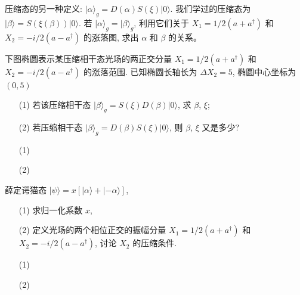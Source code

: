 \documentclass{assignment}
\begin{document}
\begin{prob}
    压缩态的另一种定义: $\lvert\alpha\rangle_g=D(\alpha)S(\xi)\lvert 0\rangle$. 我们学过的压缩态为 $\lvert\beta\rangle=S(\xi(\beta))\lvert 0\rangle$. 若 $\lvert\alpha\rangle_g=\lvert\beta\rangle_g$, 利用它们关于 $X_1=1/2(a+a^{\dagger})$ 和 $X_2=-i/2(a-a^{\dagger})$ 的涨落图, 求出 $\alpha$ 和 $\beta$ 的关系。
\end{prob}
\begin{sol}
    
\end{sol}

\begin{prob}
    下图椭圆表示某压缩相干态光场的两正交分量 $X_1=1/2(a+a^{\dagger})$ 和 $X_2=-i/2(a-a^{\dagger})$ 的涨落范围. 已知椭圆长轴长为 $\Delta X_2=5$, 椭圆中心坐标为 $(0,5)$
    \begin{itemize}
        \item[(1)] 若该压缩相干态 $\lvert\beta\rangle_g=S(\xi)D(\beta)\lvert 0\rangle$, 求 $\beta$, $\xi$;
        \item[(2)] 若压缩相干态 $\lvert\beta\rangle_g=D(\beta)S(\xi)\lvert 0\rangle$, 则 $\beta$, $\xi$ 又是多少?
    \end{itemize}
\end{prob}
\begin{sol}
    \begin{itemize}
        \item[(1)] 
        \item[(2)] 
    \end{itemize}
\end{sol}

\begin{prob}
    薛定谔猫态 $\lvert\psi\rangle=x[\lvert\alpha\rangle+\lvert-\alpha\rangle]$,
    \begin{itemize}
        \item[(1)] 求归一化系数 $x$,
        \item[(2)] 定义光场的两个相位正交的振幅分量 $X_1=1/2(a+a^{\dagger})$ 和 $X_2=-i/2(a-a^{\dagger})$, 讨论 $X_2$ 的压缩条件.
    \end{itemize}
\end{prob}
\begin{sol}
    \begin{itemize}
        \item[(1)] 
        \item[(2)] 
    \end{itemize}
\end{sol}
\end{document}
